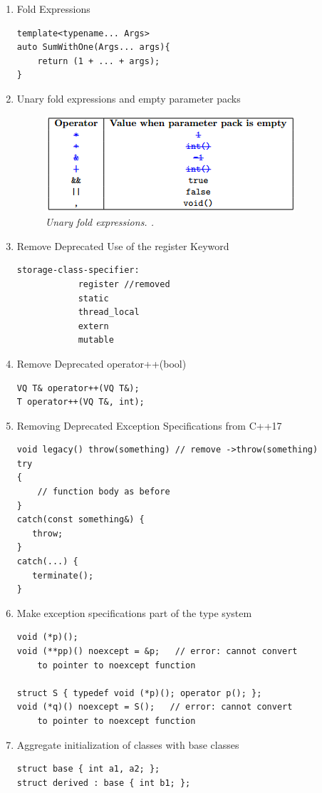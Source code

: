 \documentclass[12pt]{article}
\begin{document}
{\begin{enumerate}
\begin{lstlisting}
constexpr int *p() { return &n; }
A<p()> b; // error before C++17
\end{lstlisting}
\item Fold Expressions
\begin{lstlisting}
template<typename... Args>
auto SumWithOne(Args... args){
    return (1 + ... + args);
}
\end{lstlisting}
\item Unary fold expressions and empty parameter packs
\begin{figure}[h!]
\centering
\includegraphics[scale=0.4]{Pictures/table.png}
\caption{\textit{\color{gray}Unary fold expressions. \cite{Bartek}.}}
\end{figure}
\item Remove Deprecated Use of the register Keyword
\begin{lstlisting}
storage-class-specifier:
            register //removed
            static
            thread_local
            extern
            mutable
\end{lstlisting}
\item Remove Deprecated operator++(bool)
\begin{lstlisting}
VQ T& operator++(VQ T&);
T operator++(VQ T&, int);
\end{lstlisting}
\item Removing Deprecated Exception Specifications from C++17
\begin{lstlisting}
void legacy() throw(something) // remove ->throw(something)
try
{
    // function body as before
}
catch(const something&) {
   throw;
}
catch(...) {
   terminate();
}
\end{lstlisting}
\item Make exception specifications part of the type system
\begin{lstlisting}
void (*p)();
void (**pp)() noexcept = &p;   // error: cannot convert 
	to pointer to noexcept function

struct S { typedef void (*p)(); operator p(); };
void (*q)() noexcept = S();   // error: cannot convert 
	to pointer to noexcept function
\end{lstlisting}
\item Aggregate initialization of classes with base classes
\begin{lstlisting}
struct base { int a1, a2; };
struct derived : base { int b1; };


\end{lstlisting}
\end{enumerate}}
\end{document}
